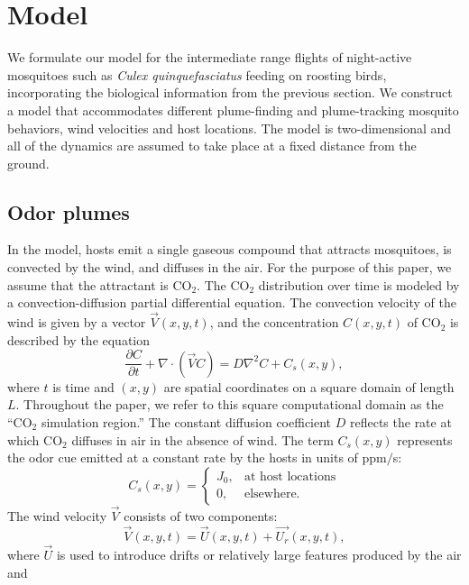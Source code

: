 \documentclass[10pt]{article}
\begin{document}
\section*{Model}

We formulate our model for the intermediate range flights of night-active mosquitoes such as \textit{Culex quinquefasciatus} feeding on roosting birds, incorporating the biological information from the previous section.   We construct a model that accommodates different plume-finding and plume-tracking mosquito behaviors, wind velocities and host locations.  The model is two-dimensional and all of the dynamics are assumed to take place at a fixed distance from the ground.


\subsection*{Odor plumes}
In the model, hosts emit a single gaseous compound that attracts mosquitoes, is convected by the wind,
and diffuses in the air. For the purpose of this paper, we assume that the attractant is CO$_2$.
The CO$_2$ distribution over time is modeled by a convection-diffusion partial differential equation.  The convection velocity of the wind is given by
a vector ${\vec V}(x,y,t)$, and the concentration $C(x,y,t)$ of CO$_2$ is described by the  equation
\begin{equation}\label{eq:conv-diff}
\frac{\partial C}{\partial t} + \nabla\cdot ( {\vec V} C ) = D\nabla^2 C + C_s(x,y),
\end{equation}
where $t$ is time and $(x,y)$ are spatial coordinates on a square domain of length $L$. Throughout the paper, we refer to this square computational domain as the ``CO$_2$ simulation region.'' The constant diffusion coefficient $D$ reflects the rate at which CO$_2$ diffuses in air in the absence of wind.
The term $C_s(x,y)$ represents the odor
cue emitted at a constant rate by the hosts in units of ppm$/$s:
\begin{equation*}
C_s(x,y) = \left\{ \begin{array}{cc} J_0, & \mbox{at host locations} \\ 0, & \mbox{elsewhere.} \end{array} \right . 
\end{equation*}
%
The wind velocity $\vec{V}$ consists of two components: 
\[
\vec{V}(x,y,t) = \vec{U}(x,y,t) + \vec{U_r}(x,y,t),
\]
where $\vec{U}$ is used to introduce drifts or
relatively large features produced by the air and
\end{document}
